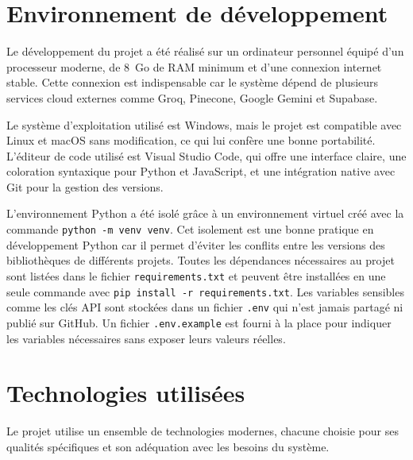 \documentclass[12pt, a4paper, twoside]{report}
\begin{document}
\section{Environnement de développement}
Le développement du projet a été réalisé sur un ordinateur personnel équipé d'un processeur moderne, de 8~Go de RAM minimum et d'une connexion internet stable. Cette connexion est indispensable car le système dépend de plusieurs services cloud externes comme Groq, Pinecone, Google Gemini et Supabase.

Le système d'exploitation utilisé est Windows, mais le projet est compatible avec Linux et macOS sans modification, ce qui lui confère une bonne portabilité. L'éditeur de code utilisé est Visual Studio Code, qui offre une interface claire, une coloration syntaxique pour Python et JavaScript, et une intégration native avec Git pour la gestion des versions.

L'environnement Python a été isolé grâce à un environnement virtuel créé avec la commande \texttt{python -m venv venv}. Cet isolement est une bonne pratique en développement Python car il permet d'éviter les conflits entre les versions des bibliothèques de différents projets. Toutes les dépendances nécessaires au projet sont listées dans le fichier \texttt{requirements.txt} et peuvent être installées en une seule commande avec \texttt{pip install -r requirements.txt}.
\newpage
Les variables sensibles comme les clés API sont stockées dans un fichier \texttt{.env} qui n'est jamais partagé ni publié sur GitHub. Un fichier \texttt{.env.example} est fourni à la place pour indiquer les variables nécessaires sans exposer leurs valeurs réelles.

\section{Technologies utilisées}
Le projet utilise un ensemble de technologies modernes, chacune choisie pour ses qualités spécifiques et son adéquation avec les besoins du système.
\end{document}
